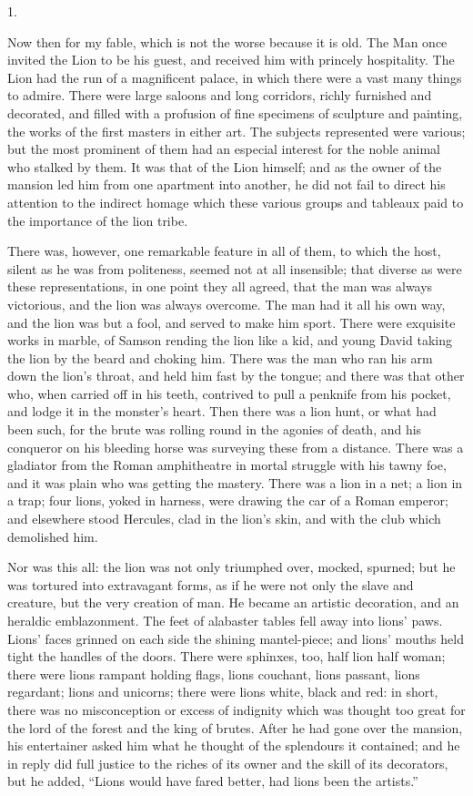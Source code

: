 1.

Now then for my fable, which is not the worse because
it is old. The Man once invited the Lion to be his guest,
and received him with princely hospitality. The Lion had
the run of a magnificent palace, in which there were a
vast many things to admire. There were large saloons and
long corridors, richly furnished and decorated, and
filled with a profusion of fine specimens of sculpture
and painting, the works of the first masters in either
art. The subjects represented were various; but the most
prominent of them had an especial interest for the noble
animal who stalked by them. It was that of the Lion
himself; and as the owner of the mansion led him from one
apartment into another, he did not fail to direct his
attention to the indirect homage which these various
groups and tableaux paid to the importance of the lion
tribe.

There was, however, one remarkable feature in all of
them, to which the host, silent as he was from
politeness, seemed not at all insensible; that diverse as
were these representations, in one point they all agreed,
that the man was always victorious, and the lion was
always overcome. The man had it all his own way, and the
lion was but a fool, and served to make him sport. There
were exquisite works in marble, of Samson rending the
lion like a kid, and young David taking the lion by the
beard and choking him. There was the man who ran his arm
down the lion's throat, and held him fast by the tongue;
and there was that other who, when carried off in his
teeth, contrived to pull a penknife from his pocket, and
lodge it in the monster's heart. Then there was a lion
hunt, or what had been such, for the brute was rolling
round in the agonies of death, and his conqueror on his
bleeding horse was surveying these from a distance. There
was a gladiator from the Roman amphitheatre in mortal
struggle with his tawny foe, and it was plain who was
getting the mastery. There was a lion in a net; a lion in
a trap; four lions, yoked in harness, were drawing the
car of a Roman emperor; and elsewhere stood Hercules,
clad in the lion's skin, and with the club which
demolished him.

Nor was this all: the lion was not only triumphed
over, mocked, spurned; but he was tortured into
extravagant forms, as if he were not only the slave and
creature, but the very creation of man. He became an
artistic decoration, and an heraldic emblazonment. The
feet of alabaster tables fell away into lions' paws.
Lions' faces grinned on each side the shining
mantel-piece; and lions' mouths held tight the handles of
the doors. There were sphinxes, too, half lion half
woman; there were lions rampant holding flags, lions
couchant, lions passant, lions regardant; lions and
unicorns; there were lions white, black and red: in
short, there was no misconception or excess of indignity
which was thought too great for the lord of the forest
and the king of brutes. After he had gone over the
mansion, his entertainer asked him what he thought of the
splendours it contained; and he in reply did full justice
to the riches of its owner and the skill of its
decorators, but he added, ``Lions would have fared
better, had lions been the artists.''

